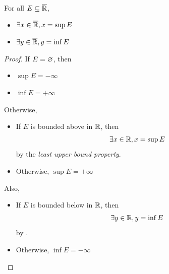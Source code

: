 \begin{theorem} \label{an:thm:supremum-infimum-in-extended-real-number-system}
    For all $E \subseteq \overline{\mathbb{R}}$,
    \begin{itemize}
        \item $\exists x \in \overline{\mathbb{R}}, x = \sup E$
        \item $\exists y \in \overline{\mathbb{R}}, y = \inf E$
    \end{itemize}
\end{theorem}

\begin{proof}
    If $E = \varnothing$, then
    \begin{itemize}
        \item $\sup E = - \infty$
        \item $\inf E = + \infty$
    \end{itemize}
    Otherwise,
    \begin{itemize}
        \item If $E$ is bounded above in $\mathbb{R}$, then
        \[
        \exists x \in \mathbb{R}, x = \sup E
        \]
        by the \emph{least upper bound property}.
        \item Otherwise, $\sup E = + \infty$
    \end{itemize}
    Also,
    \begin{itemize}
        \item If $E$ is bounded below in $\mathbb{R}$, then
        \[
        \exists y \in \mathbb{R}, y = \inf E
        \]
        by .
        \item Otherwise, $\inf E = - \infty$
    \end{itemize}
\end{proof}

